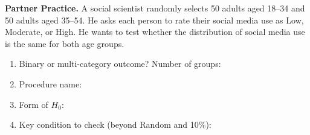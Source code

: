 \documentclass[10pt]{article}
\begin{document}
\begin{practicebox}
\textbf{Partner Practice.} \;
A social scientist randomly selects 50 adults aged 18--34 and 50 adults aged 35--54. He asks
each person to rate their social media use as Low, Moderate, or High. He wants to test whether
the distribution of social media use is the same for both age groups.

\begin{enumerate}
  \item Binary or multi-category outcome? \blank{4cm} \quad Number of groups: \blank{2cm}
  \item Procedure name: \blank{9cm}
  \item Form of $H_0$: \writeline
  \item Key condition to check (beyond Random and 10\%): \writeline
\end{enumerate}
\end{practicebox}
\end{document}
